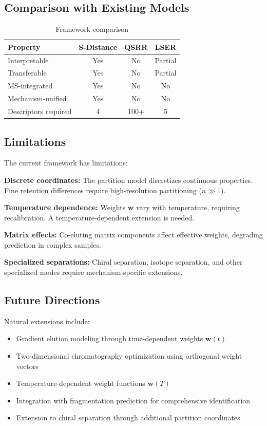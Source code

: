 \documentclass[twocolumn,10pt]{article}
\begin{document}
\subsection{Comparison with Existing Models}

\begin{table}[H]
\centering
\caption{Framework comparison}
\label{tab:comparison}
\begin{tabular}{lccc}
\toprule
Property & S-Distance & QSRR & LSER \\
\midrule
Interpretable & Yes & No & Partial \\
Transferable & Yes & No & Partial \\
MS-integrated & Yes & No & No \\
Mechanism-unified & Yes & No & No \\
Descriptors required & 4 & 100+ & 5 \\
\bottomrule
\end{tabular}
\end{table}

\subsection{Limitations}

The current framework has limitations:

\textbf{Discrete coordinates:} The partition model discretizes continuous properties. Fine retention differences require high-resolution partitioning ($n \gg 1$).

\textbf{Temperature dependence:} Weights $\mathbf{w}$ vary with temperature, requiring recalibration. A temperature-dependent extension is needed.

\textbf{Matrix effects:} Co-eluting matrix components affect effective weights, degrading prediction in complex samples.

\textbf{Specialized separations:} Chiral separation, isotope separation, and other specialized modes require mechanism-specific extensions.

\subsection{Future Directions}

Natural extensions include:
\begin{itemize}
\item Gradient elution modeling through time-dependent weights $\mathbf{w}(t)$
\item Two-dimensional chromatography optimization using orthogonal weight vectors
\item Temperature-dependent weight functions $\mathbf{w}(T)$
\item Integration with fragmentation prediction for comprehensive identification
\item Extension to chiral separation through additional partition coordinates
\end{itemize}
\end{document}
